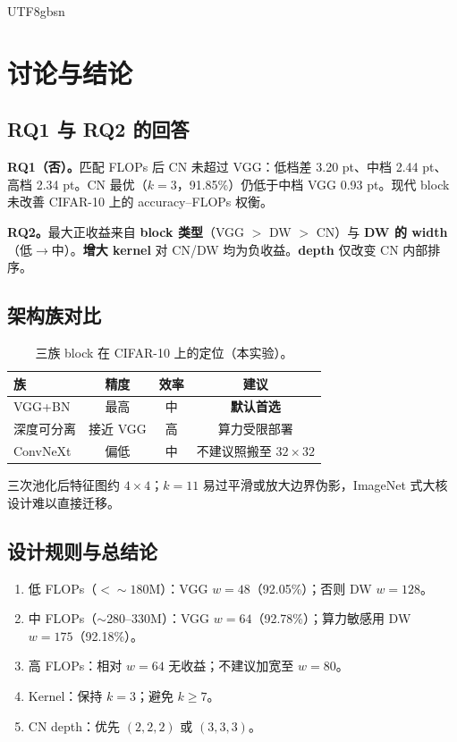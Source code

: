 \documentclass{article}
\begin{document}
\begin{CJK}{UTF8}{gbsn}
\section{讨论与结论}
\label{sec:conc}

\subsection{RQ1 与 RQ2 的回答}

\textbf{RQ1（否）。}匹配 FLOPs 后 CN 未超过 VGG：低档差 3.20 pt、中档 2.44 pt、高档 2.34 pt。CN 最优（$k{=}3$，91.85\%）仍低于中档 VGG 0.93 pt。现代 block 未改善 CIFAR-10 上的 accuracy--FLOPs 权衡。

\textbf{RQ2。}最大正收益来自 \textbf{block 类型}（VGG $>$ DW $>$ CN）与 \textbf{DW 的 width}（低$\to$中）。\textbf{增大 kernel} 对 CN/DW 均为负收益。\textbf{depth} 仅改变 CN 内部排序。

\subsection{架构族对比}

\begin{table}[t]
  \caption{三族 block 在 CIFAR-10 上的定位（本实验）。}
  \label{tab:arch}
  \centering
  \footnotesize
  \begin{tabular}{@{}lccc@{}}
    \toprule
    族 & 精度 & 效率 & 建议 \\
    \midrule
    VGG+BN & 最高 & 中 & \textbf{默认首选} \\
    深度可分离 & 接近 VGG & 高 & 算力受限部署 \\
    ConvNeXt & 偏低 & 中 & 不建议照搬至 $32{\times}32$ \\
    \bottomrule
  \end{tabular}
\end{table}

三次池化后特征图约 $4{\times}4$；$k{=}11$ 易过平滑或放大边界伪影，ImageNet 式大核设计难以直接迁移。

\subsection{设计规则与总结论}

\begin{enumerate}[label=(\roman*)]
  \item 低 FLOPs（$<{\sim}180$M）：VGG $w{=}48$（92.05\%）；否则 DW $w{=}128$。
  \item 中 FLOPs（$\sim$280--330M）：VGG $w{=}64$（92.78\%）；算力敏感用 DW $w{=}175$（92.18\%）。
  \item 高 FLOPs：相对 $w{=}64$ 无收益；不建议加宽至 $w{=}80$。
  \item Kernel：保持 $k{=}3$；避免 $k{\geq}7$。
  \item CN depth：优先 $(2,2,2)$ 或 $(3,3,3)$。
\end{enumerate}


\end{CJK}
\end{document}
